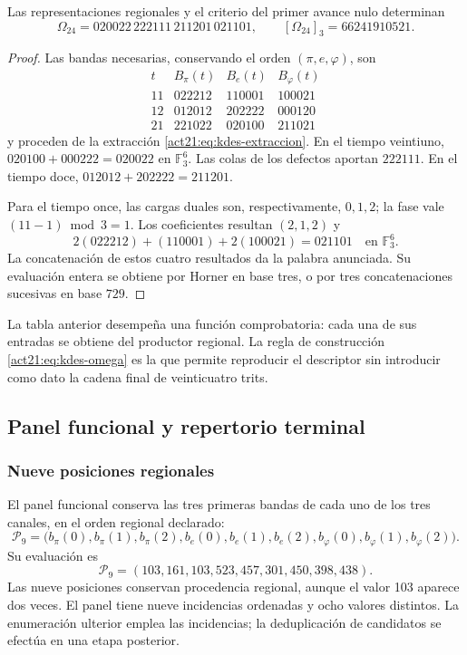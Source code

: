 \begin{proposition}
Las representaciones regionales y el criterio del primer avance nulo
determinan
\[
 \Omega_{24}=020022\,222111\,211201\,021101,
 \qquad [\Omega_{24}]_3=66241910521.
\]
\end{proposition}
\begin{proof}
Las bandas necesarias, conservando el orden $(\pi,e,\varphi)$, son
\[
 \begin{array}{c|ccc}
 t&B_\pi(t)&B_e(t)&B_\varphi(t)\\\hline
 11&022212&110001&100021\\
 12&012012&202222&000120\\
 21&221022&020100&211021
 \end{array}
\]
y proceden de la extracción \eqref{act21:eq:kdes-extraccion}. En el tiempo
veintiuno,
$020100+000222=020022$ en $\mathbb F_3^6$. Las colas de los defectos
aportan $222111$. En el tiempo doce,
$012012+202222=211201$.

Para el tiempo once, las cargas duales son, respectivamente, $0,1,2$;
la fase vale $(11-1)\bmod3=1$. Los coeficientes resultan $(2,1,2)$ y
\[
 2(022212)+(110001)+2(100021)=021101
 \quad\text{en }\mathbb F_3^6.
\]
La concatenación de estos cuatro resultados da la palabra anunciada.
Su evaluación entera se obtiene por Horner en base tres, o por tres
concatenaciones sucesivas en base $729$.
\end{proof}

La tabla anterior desempeña una función comprobatoria: cada una de sus
entradas se obtiene del productor regional. La regla de construcción
\eqref{act21:eq:kdes-omega} es la que permite reproducir el descriptor sin
introducir como dato la cadena final de veinticuatro trits.

\subsection{Panel funcional y repertorio terminal}

\subsubsection{Nueve posiciones regionales}

El panel funcional conserva las tres primeras bandas de cada uno de los
tres canales, en el orden regional declarado:
\begin{equation}
 \mathcal P_9=
 \bigl(b_\pi(0),b_\pi(1),b_\pi(2),
       b_e(0),b_e(1),b_e(2),
       b_\varphi(0),b_\varphi(1),b_\varphi(2)\bigr).
 \label{act21:eq:kdes-panel}
\end{equation}
Su evaluación es
\[
 \mathcal P_9=(103,161,103,523,457,301,450,398,438).
\]
Las nueve posiciones conservan procedencia regional, aunque el valor
103 aparece dos veces. El panel tiene nueve incidencias ordenadas y
ocho valores distintos. La enumeración ulterior emplea las incidencias;
la deduplicación de candidatos se efectúa en una etapa posterior.


